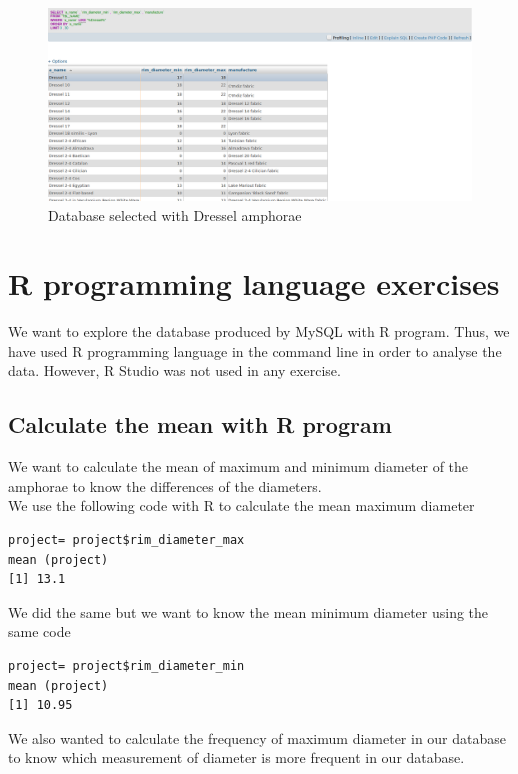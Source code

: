 \documentclass[10pt,a4paper]{article}
\begin{document}
\begin{figure}[htp]
\centering
\includegraphics[scale=0.30]{query5.png}
\caption{Database selected with Dressel amphorae}
\label{query5}
\end{figure} 

\section{R programming language exercises}

We want to explore the database produced by MySQL with R program. Thus, we have used R programming language in the command line in order to analyse the data. However, R Studio was not used in any exercise. 

\subsection{Calculate the mean with R program}

We want to calculate the mean of maximum and minimum diameter of the amphorae to know the differences of the diameters.\\

We use the following code with R to calculate the mean maximum diameter

\begin{verbatim}
project= project$rim_diameter_max
mean (project)
[1] 13.1
\end{verbatim}

We did the same but we want to know the mean minimum diameter using the same code

\begin{verbatim}
project= project$rim_diameter_min
mean (project)
[1] 10.95
\end{verbatim}

We also wanted to calculate the frequency of maximum diameter in our database to know which measurement of diameter is more frequent in our database. \\
\end{document}
